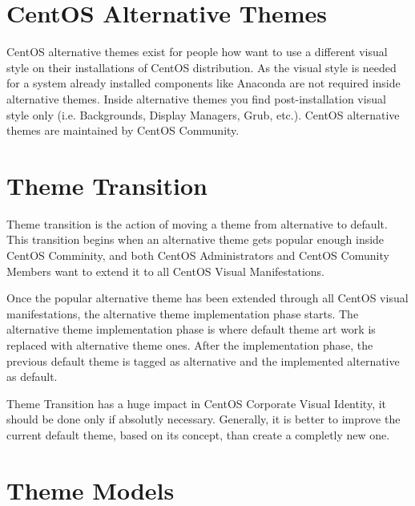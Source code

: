\section{CentOS Alternative Themes}
\hypertarget{sec:Concepts:Identity:Themes:Alternative}{}
\label{sec:Concepts:Identity:Themes:Alternative}

CentOS alternative themes exist for people how want to use a different
visual style on their installations of CentOS distribution. As the
visual style is needed for a system already installed components like
Anaconda are not required inside alternative themes. Inside
alternative themes you find post-installation visual style only (i.e.
Backgrounds, Display Managers, Grub, etc.).  CentOS alternative themes
are maintained by CentOS Community.

\section{Theme Transition}
\hypertarget{sec:Concepts:Identity:Themes:Transition}{}
\label{sec:Concepts:Identity:Themes:Transition}

Theme transition is the action of moving a theme from alternative to
default.  This transition begins when an alternative theme gets
popular enough inside CentOS Comminity, and both CentOS Administrators
and CentOS Comunity Members want to extend it to all CentOS Visual
Manifestations. 

Once the popular alternative theme has been extended through all
CentOS visual manifestations, the alternative theme implementation
phase starts. The alternative theme implementation phase is where
default theme art work is replaced with alternative theme ones. After
the implementation phase, the previous default theme is tagged as
alternative and the implemented alternative as default.

Theme Transition has a huge impact in CentOS Corporate Visual
Identity, it should be done only if absolutly necessary. Generally, it
is better to improve the current default theme, based on its concept,
than create a completly new one. 

\section{Theme Models}
\hypertarget{sec:Concepts:Identity:Themes:Models}{}
\label{sec:Concepts:Identity:Themes:Models}

